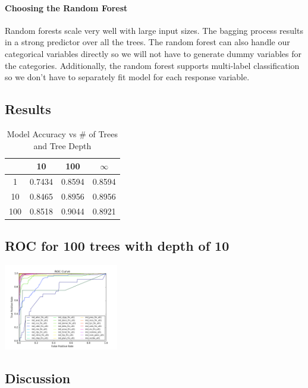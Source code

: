 \documentclass{article}
\begin{document}
\begin{spacing}{1}
\begin{large}
\paragraph{Choosing the Random Forest}

Random forests scale very well with large input sizes. The bagging process results in a strong predictor over all the trees. The random forest can also handle our categorical variables directly so we will not have to generate dummy variables for the categories. Additionally, the random forest supports multi-label classification so we don't have to separately fit model for each response variable.

\subsection{Results}
\begin{table}[H]
	\centering
	\begin{tabular}{|c|c|c|c|}
		\hline 
		\backslashbox{Trees}{Depth} & 10 & 100 & $\infty$ \\ 
		\hline 
		1 & 0.7434 & 0.8594  & 0.8594 \\ 
		10 & 0.8465 & 0.8956  & 0.8956 \\ 
		100 & 0.8518 & 0.9044  & 0.8921 \\ 
		\hline 
	\end{tabular} 
	\caption{Model Accuracy vs \# of Trees and Tree Depth}
	\label{tab:my_label}
\end{table}


\subsection{ROC for 100 trees with depth of 10}
\begin{center}
	\includegraphics[width = 5cm]{ROC.png}
\end{center}

\subsection{Discussion}


\end{large}
\end{spacing}
\end{document}
